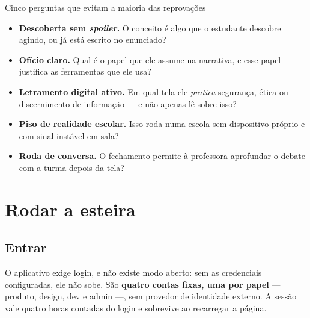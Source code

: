 \documentclass[11pt,a4paper]{article}
\newcommand{\cod}[1]{{\ttfamily\small #1}}
\begin{document}
\begin{caixaPratica}{Cinco perguntas que evitam a maioria das reprovações}
\begin{itemize}[leftmargin=1.5em,label={\color{unLavanda}$\square$}]
  \item \textbf{Descoberta sem \emph{spoiler}.} O conceito é algo que o estudante descobre agindo, ou já está escrito no enunciado?
  \item \textbf{Ofício claro.} Qual é o papel que ele assume na narrativa, e esse papel justifica as ferramentas que ele usa?
  \item \textbf{Letramento digital ativo.} Em qual tela ele \emph{pratica} segurança, ética ou discernimento de informação --- e não apenas lê sobre isso?
  \item \textbf{Piso de realidade escolar.} Isso roda numa escola sem dispositivo próprio e com sinal instável em sala?
  \item \textbf{Roda de conversa.} O fechamento permite à professora aprofundar o debate com a turma depois da tela?
\end{itemize}
\end{caixaPratica}

\section{Rodar a esteira}

\subsection{Entrar}

O aplicativo exige login, e não existe modo aberto: sem as credenciais configuradas, ele não sobe. São \textbf{quatro contas fixas, uma por papel} --- \cod{produto}, \cod{design}, \cod{dev} e \cod{admin} ---, sem provedor de identidade externo. A sessão vale quatro horas contadas do login e sobrevive ao recarregar a página.
\end{document}
